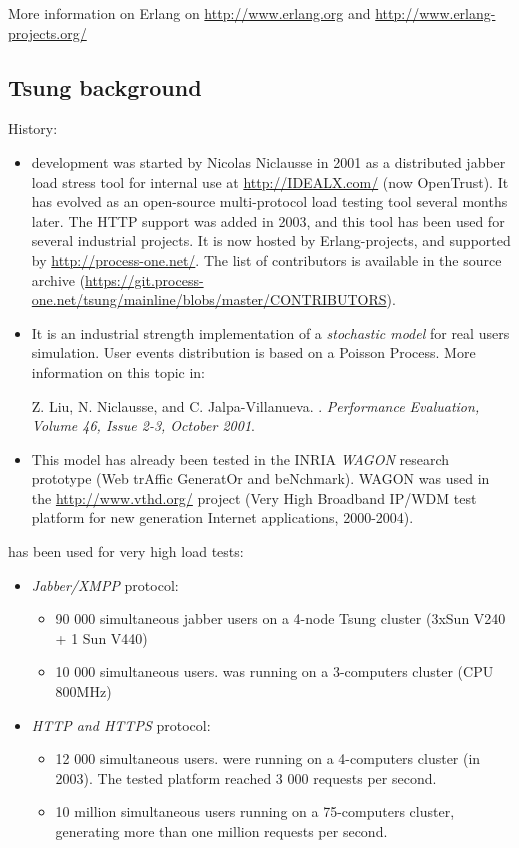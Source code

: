 \documentclass{TSUNG-en}
\begin{document}
More information on Erlang on \url{http://www.erlang.org} and
\url{http://www.erlang-projects.org/}


\subsection{Tsung background}

History:
\begin{itemize}
\item {} development was started by Nicolas Niclausse in
  2001 as a distributed jabber load stress tool for internal use at
  \url{http://IDEALX.com/} (now OpenTrust).  It has evolved as an open-source
  multi-protocol load testing tool several months later. The HTTP
  support was added in 2003, and this tool has been used for several
  industrial projects.  It is now hosted by Erlang-projects, and
  supported by \url{http://process-one.net/}. The list of contributors
  is available in the source archive
  (\url{https://git.process-one.net/tsung/mainline/blobs/master/CONTRIBUTORS}).

\item It is an industrial strength implementation of a \emph{stochastic model}
for real users simulation. User events distribution is based on a
Poisson Process. More information on this topic in:

Z. Liu, N. Niclausse, and C. Jalpa-Villanueva.  . \emph{Performance Evaluation,
Volume 46, Issue 2-3, October 2001}.

\item This model has already been tested in the INRIA \emph{WAGON}
  research prototype (Web trAffic GeneratOr and beNchmark). WAGON was
  used in the \url{http://www.vthd.org/} project (Very High Broadband
  IP/WDM test platform for new generation Internet applications, 2000-2004).

\end{itemize}

 has been used for very high load tests:

\begin{itemize}
\item \emph{Jabber/XMPP} protocol:
  \begin{itemize}
  \item 90 000 simultaneous jabber users on a
  4-node Tsung cluster (3xSun V240 + 1 Sun V440)
\item 10 000 simultaneous users.
   was running on a 3-computers cluster (CPU
  800MHz)
  \end{itemize}
\item \emph{HTTP and HTTPS} protocol:
  \begin{itemize}
  \item 12 000 simultaneous users.
   were running on a 4-computers cluster (in 2003). The
  tested platform reached 3 000 requests per second.
 \item 10 million simultaneous users running on a 75-computers cluster,
  generating more than one million requests per second.
  \end{itemize}
\end{itemize}
\end{document}
